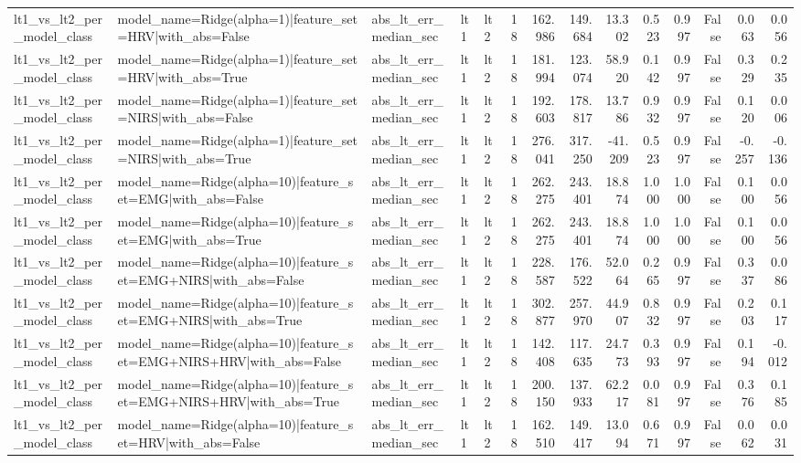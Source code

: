 \begin{table}
\begin{tabular}{lllllrrrrrrrrr}
lt1_vs_lt2_per_model_class & model_name=Ridge(alpha=1)|feature_set=HRV|with_abs=False & abs_lt_err_median_sec & lt1 & lt2 & 18 & 162.986 & 149.684 & 13.302 & 0.523 & 0.997 & False & 0.063 & 0.056 \\
lt1_vs_lt2_per_model_class & model_name=Ridge(alpha=1)|feature_set=HRV|with_abs=True & abs_lt_err_median_sec & lt1 & lt2 & 18 & 181.994 & 123.074 & 58.920 & 0.142 & 0.997 & False & 0.329 & 0.235 \\
lt1_vs_lt2_per_model_class & model_name=Ridge(alpha=1)|feature_set=NIRS|with_abs=False & abs_lt_err_median_sec & lt1 & lt2 & 18 & 192.603 & 178.817 & 13.786 & 0.932 & 0.997 & False & 0.120 & 0.006 \\
lt1_vs_lt2_per_model_class & model_name=Ridge(alpha=1)|feature_set=NIRS|with_abs=True & abs_lt_err_median_sec & lt1 & lt2 & 18 & 276.041 & 317.250 & -41.209 & 0.523 & 0.997 & False & -0.257 & -0.136 \\
lt1_vs_lt2_per_model_class & model_name=Ridge(alpha=10)|feature_set=EMG|with_abs=False & abs_lt_err_median_sec & lt1 & lt2 & 18 & 262.275 & 243.401 & 18.874 & 1.000 & 1.000 & False & 0.100 & 0.056 \\
lt1_vs_lt2_per_model_class & model_name=Ridge(alpha=10)|feature_set=EMG|with_abs=True & abs_lt_err_median_sec & lt1 & lt2 & 18 & 262.275 & 243.401 & 18.874 & 1.000 & 1.000 & False & 0.100 & 0.056 \\
lt1_vs_lt2_per_model_class & model_name=Ridge(alpha=10)|feature_set=EMG+NIRS|with_abs=False & abs_lt_err_median_sec & lt1 & lt2 & 18 & 228.587 & 176.522 & 52.064 & 0.265 & 0.997 & False & 0.337 & 0.086 \\
lt1_vs_lt2_per_model_class & model_name=Ridge(alpha=10)|feature_set=EMG+NIRS|with_abs=True & abs_lt_err_median_sec & lt1 & lt2 & 18 & 302.877 & 257.970 & 44.907 & 0.832 & 0.997 & False & 0.203 & 0.117 \\
lt1_vs_lt2_per_model_class & model_name=Ridge(alpha=10)|feature_set=EMG+NIRS+HRV|with_abs=False & abs_lt_err_median_sec & lt1 & lt2 & 18 & 142.408 & 117.635 & 24.773 & 0.393 & 0.997 & False & 0.194 & -0.012 \\
lt1_vs_lt2_per_model_class & model_name=Ridge(alpha=10)|feature_set=EMG+NIRS+HRV|with_abs=True & abs_lt_err_median_sec & lt1 & lt2 & 18 & 200.150 & 137.933 & 62.217 & 0.081 & 0.997 & False & 0.376 & 0.185 \\
lt1_vs_lt2_per_model_class & model_name=Ridge(alpha=10)|feature_set=HRV|with_abs=False & abs_lt_err_median_sec & lt1 & lt2 & 18 & 162.510 & 149.417 & 13.094 & 0.671 & 0.997 & False & 0.062 & 0.031 \\

\end{tabular}
\end{table}

